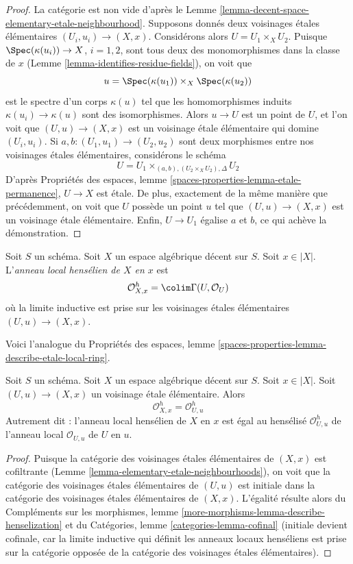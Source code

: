 \begin{proof}
La catégorie est non vide d'après le
Lemme \ref{lemma-decent-space-elementary-etale-neighbourhood}.
Supposons donnés deux voisinages étales élémentaires
$(U_i, u_i) \to (X, x)$.
Considérons alors $U = U_1 \times_X U_2$. Puisque
$\Spec(\kappa(u_i)) \to X$, $i = 1, 2$, sont tous deux des monomorphismes
dans la classe de $x$ (Lemme \ref{lemma-identifies-residue-fields}),
on voit que
$$
u = \Spec(\kappa(u_1)) \times_X \Spec(\kappa(u_2))
$$
est le spectre d'un corps $\kappa(u)$ tel que les homomorphismes induits
$\kappa(u_i) \to \kappa(u)$ sont des isomorphismes. Alors
$u \to U$ est un point de $U$, et l'on voit que $(U, u) \to (X, x)$ est un
voisinage étale élémentaire qui domine $(U_i, u_i)$.
Si $a, b : (U_1, u_1) \to (U_2, u_2)$ sont deux morphismes entre
nos voisinages étales élémentaires, considérons le schéma
$$
U = U_1 \times_{(a, b), (U_2 \times_X U_2), \Delta} U_2
$$
D'après Propriétés des espaces, lemme
\ref{spaces-properties-lemma-etale-permanence},
$U \to X$ est étale. De plus, exactement de la même manière que précédemment,
on voit que $U$ possède un point $u$
tel que $(U, u) \to (X, x)$ est un voisinage
étale élémentaire. Enfin, $U \to U_1$ égalise $a$ et $b$,
ce qui achève la démonstration.
\end{proof}

\begin{definition}
\label{definition-henselian-local-ring}
Soit $S$ un schéma. Soit $X$ un espace algébrique décent sur $S$.
Soit $x \in |X|$. L'{\it anneau local hensélien de $X$ en $x$} est
$$
\mathcal{O}_{X, x}^h = \colim \Gamma(U, \mathcal{O}_U)
$$
où la limite inductive est prise sur les voisinages étales élémentaires
$(U, u) \to (X, x)$.
\end{definition}

\noindent
Voici l'analogue du
Propriétés des espaces, lemme
\ref{spaces-properties-lemma-describe-etale-local-ring}.

\begin{lemma}
\label{lemma-describe-henselian-local-ring}
Soit $S$ un schéma. Soit $X$ un espace algébrique décent sur $S$.
Soit $x \in |X|$. Soit $(U, u) \to (X, x)$ un voisinage
étale élémentaire. Alors
$$
\mathcal{O}_{X, x}^h = \mathcal{O}_{U, u}^h
$$
Autrement dit : l'anneau local hensélien de $X$ en $x$
est égal au hensélisé $\mathcal{O}_{U, u}^h$
de l'anneau local $\mathcal{O}_{U, u}$ de $U$ en $u$.
\end{lemma}

\begin{proof}
Puisque la catégorie des voisinages étales élémentaires de $(X, x)$
est cofiltrante (Lemme \ref{lemma-elementary-etale-neighbourhoods}),
on voit que
la catégorie des voisinages étales élémentaires de $(U, u)$
est initiale dans
la catégorie des voisinages étales élémentaires de $(X, x)$.
L'égalité résulte alors du
Compléments sur les morphismes, lemme \ref{more-morphisms-lemma-describe-henselization}
et du
Catégories, lemme \ref{categories-lemma-cofinal}
(initiale devient cofinale, car la limite inductive
qui définit les anneaux locaux henséliens est prise sur la
catégorie opposée de la catégorie des voisinages
étales élémentaires).
\end{proof}

